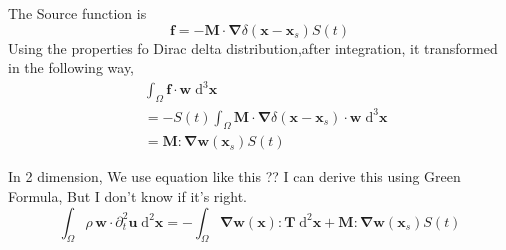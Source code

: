 \documentclass{book}
\begin{document}
The Source function is 
\begin{equation}
 \boldsymbol{f} = -\boldsymbol{M}\cdot\boldsymbol\nabla\delta(\boldsymbol x-\boldsymbol x_s)S(t)
\end{equation}
Using the properties fo Dirac delta distribution,after integration, it transformed in the following way,
\begin{equation}
\begin{aligned}
 &\int_\Omega \boldsymbol f\cdot \boldsymbol w\;\mathrm{d}^3\boldsymbol x\\
 &= -S(t)\int_\Omega\boldsymbol{M}\cdot \boldsymbol\nabla\delta(\boldsymbol x-\boldsymbol x_s)\cdot \boldsymbol w\;\mathrm{d}^3\boldsymbol x\\
 &= \boldsymbol{M}:\boldsymbol{\nabla w}(\boldsymbol x_s)S (t)
\end{aligned}
\end{equation}

In 2 dimension, We use equation like this ?? I can derive this using Green Formula, But I don't know if it's right. 
\begin{equation}
 \int_\Omega \rho\,\boldsymbol w\cdot \partial_t^2\boldsymbol u\;\mathrm{d}^2\boldsymbol x = -\int_\Omega \boldsymbol{\nabla}\boldsymbol w(\boldsymbol x): \boldsymbol T\;\mathrm{d}^2\boldsymbol x + \boldsymbol{M}:\boldsymbol{\nabla w}(\boldsymbol x_s)S (t)
\end{equation}








  
\end{document}
